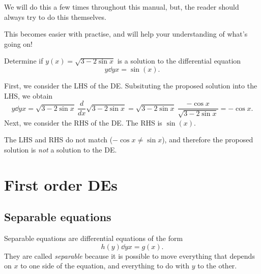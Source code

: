 \documentclass{book}
\begin{document}
We will do this a few times throughout this manual, but, the reader
should always try to do this themselves.

This becomes easier with practise, and will help your understanding of
what's going on!

\begin{example*}
  Determine if $y(x) = \sqrt{3-2\sin x}$ is a solution to the
  differential equation
  \begin{dmath*}
    y \dd{y}{x} = \sin(x).
  \end{dmath*}
\end{example*}

\begin{solution}
  First, we consider the LHS of the DE.  Subsituting the proposed
  solution into the LHS, we obtain
  \begin{dmath*}
    y \dd{y}{x} = \sqrt{3-2\sin x}\ \frac{d}{dx} \sqrt{3-2\sin x}
                = \sqrt{3-2\sin x}\ \frac{-\cos x}{\sqrt{3-2\sin x}}
                = - \cos x.
  \end{dmath*}
  Next, we consider the RHS of the DE.  The RHS is $\sin(x)$.

  The LHS and RHS do not match ($-\cos x \neq \sin x$), and therefore
  the proposed solution is \emph{not} a solution to the DE.
\end{solution}


\newpage
\chapter{First order DEs}



\newpage
\section{Separable equations}

Separable equations are differential equations of the form
\begin{dmath}
  \label{eq:separable}
  h(y) \dd{y}{x} = g(x).
\end{dmath}
They are called \emph{separable} because it is possible to move
everything that depends on $x$ to one side of the equation, and
everything to do with $y$ to the other.
\end{document}
